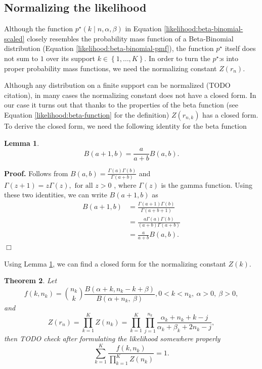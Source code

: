 \documentclass[officiallayout]{tktla}
\newtheorem{theorem}{Theorem}[section]
\newtheorem{lemma}[theorem]{Lemma}
\newtheorem{theorem}{Theorem}[chapter]
\newenvironment{proof}{\noindent\textbf{Proof.} }{$\Box$}
\begin{document}
\subsection{Normalizing the likelihood}

Although the function $p^{\star}\left(k \middle| n, \alpha,
\beta\right)$ in Equation \ref{likelihood:beta-binomial-scaled}
closely resembles the probability mass function of a Beta-Binomial
distribution (Equation \ref{likelihood:beta-binomial-pmf}), the
function $p^{\star}$ itself does not sum to $1$ over its support $k
\in \left\{ 1, \dots, K \right\}$. In order to turn the $p^{\star}$:s
into proper probability mass functions, we need the normalizing
constant $Z\left(r_{n}\right)$.

Although any distribution on a finite support can be normalized (TODO
citation), in many cases the normalizing constant does not have a
closed form. In our case it turns out that \textemdash thanks to the
properties of the beta function (see Equation
\ref{likelihood:beta-function} for the definition) \textemdash 
$Z\left(r_{n, k}\right)$ has a closed form. To derive the closed form,
we need the following identity for the beta function
\begin{lemma}
  \label{lemma:beta-function-identity}
  \[
  B\left(a + 1, b\right) = \frac{a}{a + b}B\left(a, b\right).
  \]
\end{lemma}

\begin{proof}
  Follows from $B\left(a, b\right) = \frac{\Gamma\left(a\right)\Gamma\left(b\right)}{\Gamma\left(a + b\right)}$ \citep{artin_einfuhrung} and $\Gamma\left(z + 1\right) = z\Gamma\left(z\right), \text{ for all } z > 0$ \citep{davis_leonhard}, where $\Gamma\left(z\right)$ is the gamma function. Using these two identities, we can write $B\left(a + 1, b\right)$ as
  \begin{align*}
    B\left(a + 1, b\right) &= \frac{\Gamma\left(a + 1\right)\Gamma\left(b\right)}{\Gamma\left(a + b + 1\right)} \\
    &= \frac{a\Gamma\left(a\right)\Gamma\left(b\right)}{\left(a + b\right)\Gamma\left(a + b\right)} \\
    &= \frac{a}{a + b}B\left(a, b\right).
  \end{align*}
\end{proof}

Using Lemma \ref{lemma:beta-function-identity}, we can find a closed form for the normalizing constant $Z\left(k\right)$.
\begin{theorem}
  \label{theorem:likelihood-can-be-normalized}
  Let
  \[
  f\left(k, n_{k}\right) = \binom{n_{k}}{k}\frac{B\left(\alpha + k, n_{k} - k + \beta\right)}{B\left(\alpha + n_{k}, \: \beta\right)}, 0 < k < n_{k}, \: \alpha > 0, \: \beta > 0,
  \]
  and
  \[
  Z\left(r_{n}\right) = \prod_{k = 1}^{K}Z\left(n_{k}\right) = \prod_{k = 1}^{K}\prod_{j = 1}^{n_{k}}\frac{\alpha_{k} + n_{k} + k - j}{\alpha_{k} + \beta_{k} + 2n_{k} - j},
  \]
  then TODO check after formulating the likelihood somewhere properly
  \[
  \sum_{k = 1}^{K} \frac{f\left(k, n_{k}\right)}{\prod_{k = 1}^{K}Z\left(n_{k}\right)} = 1.
  \]
\end{theorem}
\end{document}
